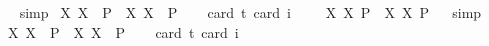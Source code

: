 \begin{isabellebody}
\isadelimproof
\ %
\endisadelimproof
%
\isatagproof
{}\isamarkupfalse%
\ simp%
\endisatagproof
{\isafoldproof}%
%
\isadelimproof
%
\endisadelimproof
\isanewline
{}\isamarkupfalse%
\ {\isachardoublequoteopen}{\isasymlfloor}{\isacharparenleft}{\isasymlambda}X{\isachardot}\ \isactrlbold {\isasymdiamond}\isactrlbold {\isasymexists}X{\isacharparenright}\ \ {\isacharparenleft}P{\isacharcolon}{\isacharcolon}{\isasymup}{\isasymlangle}{\isasymup}{\isasymzero}{\isasymrangle}{\isacharparenright}\ \isactrlbold {\isasymrightarrow}\ {\isacharparenleft}{\isasymlambda}X{\isachardot}\ \isactrlbold {\isasymexists}X{\isacharparenright}\ \ P{\isasymrfloor}{\isachardoublequoteclose}\ \isanewline
\ \ \isamarkupfalse%
{\isacharbrackleft}card\ {\isacharprime}t{\isacharequal}{}{\isacharcomma}\ card\ i{\isacharequal}{}{\isacharbrackright}%
\isadelimproof
\ %
\endisadelimproof
%
\isatagproof
{}\isamarkupfalse%
\ %
%
\endisatagproof
{\isafoldproof}%
%
\isadelimproof
%
\endisadelimproof
\isanewline
{}\isamarkupfalse%
\ {\isachardoublequoteopen}{\isasymlfloor}{\isacharparenleft}{\isasymlambda}X{\isachardot}\ \isactrlbold {\isasymdiamond}\isactrlbold {\isasymexists}X{\isacharparenright}\ \isactrlbold {\isasymdown}{\isacharparenleft}P{\isacharcolon}{\isacharcolon}{\isasymup}{\isasymlangle}{\isasymlangle}{\isasymzero}{\isasymrangle}{\isasymrangle}{\isacharparenright}\ \isactrlbold {\isasymrightarrow}\ {\isacharparenleft}{\isasymlambda}X{\isachardot}\ \isactrlbold {\isasymexists}X{\isacharparenright}\ \isactrlbold {\isasymdown}P{\isasymrfloor}{\isachardoublequoteclose}%
\isadelimproof
\ %
\endisadelimproof
%
\isatagproof
{}\isamarkupfalse%
\ simp%
\endisatagproof
{\isafoldproof}%
%
\isadelimproof
%
\endisadelimproof
\isanewline
{}\isamarkupfalse%
\ {\isachardoublequoteopen}{\isasymlfloor}{\isacharparenleft}{\isasymlambda}X{\isachardot}\ \isactrlbold {\isasymdiamond}\isactrlbold {\isasymexists}X{\isacharparenright}\ \ {\isacharparenleft}P{\isacharcolon}{\isacharcolon}{\isasymup}{\isasymlangle}{\isasymlangle}{\isasymzero}{\isasymrangle}{\isasymrangle}{\isacharparenright}\ \isactrlbold {\isasymrightarrow}\ {\isacharparenleft}{\isasymlambda}X{\isachardot}\ \isactrlbold {\isasymexists}X{\isacharparenright}\ \ P{\isasymrfloor}{\isachardoublequoteclose}\ \isanewline
\ \ \isamarkupfalse%
{\isacharbrackleft}card\ {\isacharprime}t{\isacharequal}{}{\isacharcomma}\ card\ i{\isacharequal}{}{\isacharbrackright}%

\end{isabellebody}
